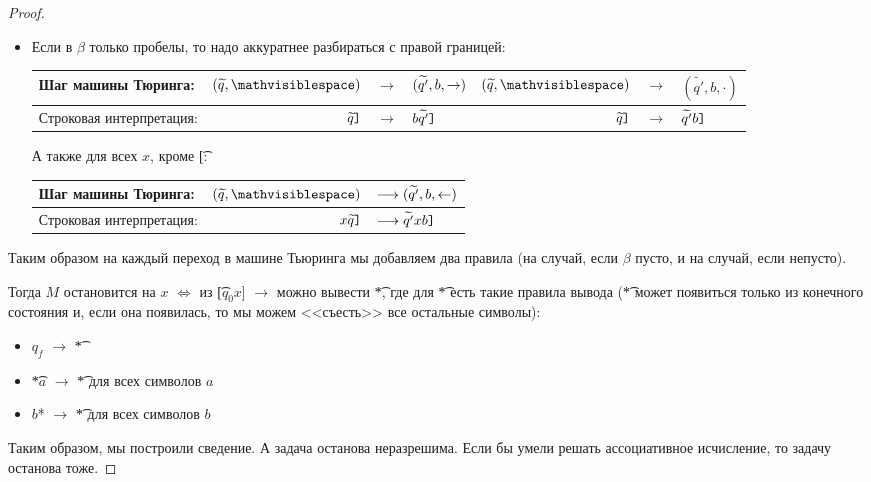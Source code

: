 \begin{proof}
\begin{itemize}
	\item
		Если в $\beta$ только пробелы, то надо аккуратнее разбираться с правой границей:

		\begin{tabular}{|l|rcl|rcl|}
		\hline
			Шаг машины Тюринга: &
			$(\widetilde{q}, \mathvisiblespace)$ & $\longrightarrow$ & $(\widetilde{q'}, b, \rightarrow)$ &
			$(\widetilde{q}, \mathvisiblespace)$ & $\longrightarrow$ & $(\widetilde{q'}, b, \cdot)$
		\\\hline
			Строковая интерпретация: &
			$\widetilde{q}\texttt{]}$ & $\longrightarrow$ & $b\widetilde{q'}\texttt{]}$ &
			$\widetilde{q}\texttt{]}$ & $\longrightarrow$ & $\widetilde{q'}b\texttt{]}$
		\\\hline
		\end{tabular}

		А также для всех $x$, кроме \t{[}:

		\begin{tabular}{|l|rl|}
		\hline
			Шаг машины Тюринга: &
			$(\widetilde{q}, \mathvisiblespace)$ & $\longrightarrow (\widetilde{q'}, b, \leftarrow)$
		\\\hline
			Строковая интерпретация: &
			$x\widetilde{q}\texttt{]}$ & $\longrightarrow \widetilde{q'}xb\texttt{]}$
		\\\hline
		\end{tabular}
	\end{itemize}
	Таким образом на каждый переход в машине Тьюринга мы добавляем два правила (на случай, если $\beta$ пусто, и на случай, если непусто).

	Тогда $M$ остановится на $x$ $\iff$ из \t{[$q_0$$x$]} $\rightarrow$ можно вывести \t{*}, где для \t{*} есть такие правила вывода
	(\t{*} может появиться только из конечного состояния и, если она появилась, то мы можем <<съесть>> все остальные символы):

	\begin{itemize}
	\item $q_f$ $\rightarrow$ \t{*}
	\item \t{*$a$} $\rightarrow$ \t{*} для всех символов $a$
	\item \t{$b$*} $\rightarrow$ \t{*} для всех символов $b$
	\end{itemize}

   Таким образом, мы построили сведение.
   А задача останова неразрешима.
   Если бы умели решать ассоциативное исчисление, то задачу останова тоже.
\end{proof}

